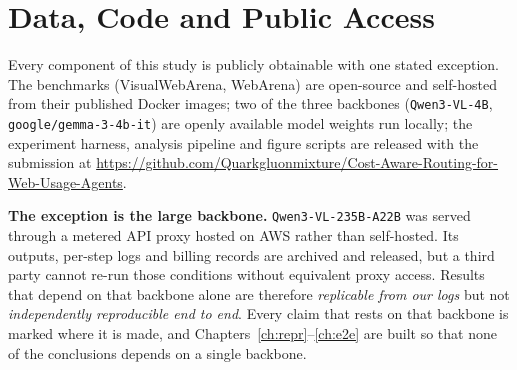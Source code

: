 \clearpage
{
    \pagestyle{access}
    \chapter*{Data, Code and Public Access}

Every component of this study is publicly obtainable with one stated exception.
The benchmarks (VisualWebArena, WebArena) are open-source and self-hosted from
their published Docker images; two of the three backbones
(\texttt{Qwen3-VL-4B}, \texttt{google/gemma-3-4b-it}) are openly available model
weights run locally; the experiment harness, analysis pipeline and figure
scripts are released with the submission at
\url{https://github.com/Quarkgluonmixture/Cost-Aware-Routing-for-Web-Usage-Agents}.

\textbf{The exception is the large backbone.} \texttt{Qwen3-VL-235B-A22B} was
served through a metered API proxy hosted on AWS rather than self-hosted. Its outputs,
per-step logs and billing records are archived and released, but a third party
cannot re-run those conditions without equivalent proxy access. Results that
depend on that backbone alone are therefore \emph{replicable from our logs} but
not \emph{independently reproducible end to end}. Every claim that rests on
that backbone is marked where it is made, and
Chapters~\ref{ch:repr}--\ref{ch:e2e} are built so that none of the conclusions
depends on a single backbone.

    \thispagestyle{access}
}
\newpage
